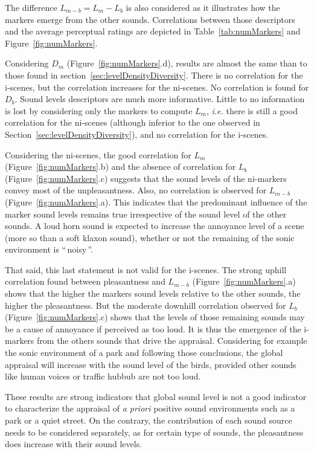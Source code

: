 \documentclass[twoside,twocolumn]{article}
\begin{document}
The difference $L_{m-b}=L_m-L_b$ is also considered as it illustrates how the markers emerge from the other sounds. Correlations between those descriptors and the average perceptual ratings are depicted in Table~\ref{tab:numMarkers} and Figure~\ref{fig:numMarkers}.

Considering $D_{m}$ (Figure~\ref{fig:numMarkers}.d), results are almost the same than to those found in section~\ref{sec:levelDensityDiversity}. There is no correlation for the i-scenes, but the correlation increases for the ni-scenes. No correlation is found for $D_{b}$. Sound levels descriptors are much more informative. Little to no information is lost by considering only the markers to compute $L_m$, \emph{i.e.} there is still a good correlation for the ni-scenes (although inferior to the one observed in Section~\ref{sec:levelDensityDiversity}), and no correlation for the i-scenes.

Considering the ni-scenes, the good correlation for $L_m$  (Figure~\ref{fig:numMarkers}.b) and the absence of correlation for $L_{b}$  (Figure~\ref{fig:numMarkers}.c) suggests that the sound levels of the ni-markers convey most of the unpleasantness. Also, no correlation is observed for $L_{m-b}$ (Figure~\ref{fig:numMarkers}.a). This indicates that the predominant influence of the marker sound levels remains true irrespective of the sound level of the other sounds. A loud horn sound is expected to increase the annoyance level of a scene (more so than a soft klaxon sound), whether or not the remaining of the sonic environment is ``\,noisy\,''.

That said, this last statement is not valid for the i-scenes. The strong uphill correlation found between pleasantness and  $L_{m-b}$ (Figure~\ref{fig:numMarkers}.a) shows that the higher the markers sound levels relative to the other sounds, the higher the pleasantness. But the moderate downhill correlation observed for $L_{b}$ (Figure~\ref{fig:numMarkers}.c) shows that the levels of those remaining sounds may be a cause of annoyance if perceived as too loud. It is thus the emergence of the i-markers from the others sounds that drive the appraisal. Considering for example the sonic environment of a park and following those conclusions, the global appraisal will increase with the sound level of the birds, provided other sounds like human voices or traffic hubbub are not too loud.

These results are strong indicators that global sound level is not a good indicator to characterize the appraisal of \emph{a priori} positive sound environments such as a park or a quiet street. On the contrary, the contribution of each sound source needs to be considered separately, as for certain type of sounds, the pleasantness does increase with their sound levels.
\end{document}
